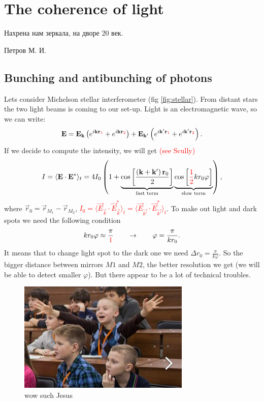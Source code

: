\section{The coherence of light}

\epigraph{Нахрена нам зеркала, на дворе 20 век.}{Петров М. И.}

\subsection{Bunching and antibunching of photons}

Lets consider Michelson stellar interferometer (fig \ref{fig:stellar}). From distant stars the two light beams is coming to our set-up. Light is an electromagnetic wave, so we can write:
\begin{equation}
	\vec{E} = \vec{E}_{\vec{k}} \left( e^{i \vec{k} \vec{r}_{\textcolor{red}{1}}}  + e^{i \vec{k} \vec{r}_{\textcolor{red}{2}}} \right) + \vec{E}_{\vec{k}'} \left( e^{i \vec{k'} \vec{r}_{\textcolor{red}{1}}} + e^{i \vec{k}' \vec{r}_{\textcolor{red}{2}}} \right).
\end{equation}
If we decide to compute the intensity, we will get { \textcolor{red} {(see Scully)}}
\begin{equation}
	I = \langle \vec{E} \cdot \vec{E}^* \rangle_t  = 4 I_0 \left( 1 + \underbrace{\cos \left[\frac{\left( \vec{k} + \vec{k}' \right) \vec{r}_0}{2}\right]}_{\text{fast term}} \underbrace{\cos \left[{\textcolor{red}\half}  k r_0 \varphi \right]}_{\text{slow term}} \right),
\end{equation}
where $\vec{r}_0 = \vec{r}_{M_1} - \vec{r}_{M_2}$, {\textcolor{red}{$I_0=\langle \vec{E}_{\vec{k}} \cdot \vec{E}_{\vec{k}}^* \rangle_t=\langle \vec{E}_{\vec{k'}} \cdot \vec{E}_{\vec{k'}}^* \rangle_t$}}. To make out light and dark spots we need the following condition
\begin{equation}
	k r_0 \varphi \approx \frac{\pi}{{\textcolor{red} 1}} \qquad \to \qquad \varphi = \frac{\pi}{k r_0}.
\end{equation}
It means that to change light spot to the dark one  we need $\Delta r_0 = \frac{\pi}{k \varphi}$. So the bigger distance between mirrors $M1$ and $M2$, the better resolution we get (we will be able to detect smaller $\varphi$). But there appear to be a lot of technical troubles.
\begin{figure}
	\centering
	\includegraphics[width=0.5\linewidth]{fig/L3/Ij8NUO6Gat0}
	\caption{wow such Jesus}
	\label{fig:jesus}
\end{figure}

